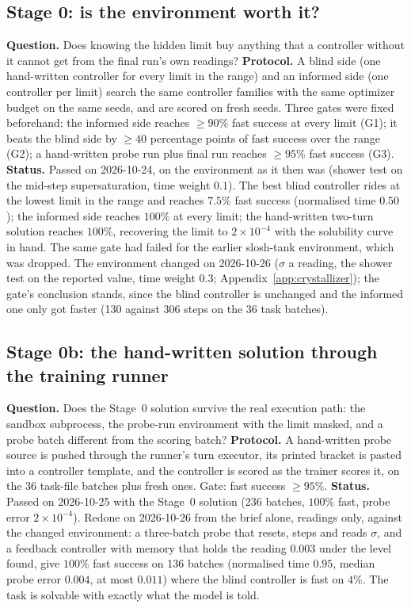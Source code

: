 \documentclass[11pt,a4paper]{article}
\begin{document}
\subsection{Stage 0: is the environment worth it?}
\textbf{Question.} Does knowing the hidden limit buy anything that a controller without it cannot get from the final run's own readings?
\textbf{Protocol.} A blind side (one hand-written controller for every limit in the range) and an informed side (one controller per limit) search the same controller families with the same optimizer budget on the same seeds, and are scored on fresh seeds. Three gates were fixed beforehand: the informed side reaches $\ge 90\%$ fast success at every limit (G1); it beats the blind side by $\ge 40$ percentage points of fast success over the range (G2); a hand-written probe run plus final run reaches $\ge 95\%$ fast success (G3).
\textbf{Status.} Passed on 2026-10-24, on the environment as it then was (shower test on the mid-step supersaturation, time weight $0.1$). The best blind controller rides at the lowest limit in the range and reaches $7.5\%$ fast success (normalised time $0.50$); the informed side reaches $100\%$ at every limit; the hand-written two-turn solution reaches $100\%$, recovering the limit to $2\times10^{-4}$ with the solubility curve in hand. The same gate had failed for the earlier slosh-tank environment, which was dropped. The environment changed on 2026-10-26 ($\sigma$ a reading, the shower test on the reported value, time weight $0.3$; Appendix~\ref{app:crystallizer}); the gate's conclusion stands, since the blind controller is unchanged and the informed one only got faster (130 against 306 steps on the 36 task batches).

\subsection{Stage 0b: the hand-written solution through the training runner}
\textbf{Question.} Does the Stage~0 solution survive the real execution path: the sandbox subprocess, the probe-run environment with the limit masked, and a probe batch different from the scoring batch?
\textbf{Protocol.} A hand-written probe source is pushed through the runner's turn executor, its printed bracket is pasted into a controller template, and the controller is scored as the trainer scores it, on the 36 task-file batches plus fresh ones. Gate: fast success $\ge 95\%$.
\textbf{Status.} Passed on 2026-10-25 with the Stage~0 solution (236 batches, $100\%$ fast, probe error $2\times10^{-4}$). Redone on 2026-10-26 from the brief alone, readings only, against the changed environment: a three-batch probe that resets, steps and reads $\sigma$, and a feedback controller with memory that holds the reading $0.003$ under the level found, give $100\%$ fast success on 136 batches (normalised time $0.95$, median probe error $0.004$, at most $0.011$) where the blind controller is fast on $4\%$. The task is solvable with exactly what the model is told.
\end{document}
